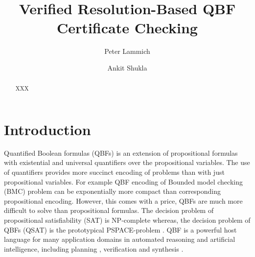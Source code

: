 \documentclass[runningheads]{llncs}
\newcommand{\0}{0}
\newcommand{\1}{1}
\begin{document}

%
\title{Verified Resolution-Based QBF Certificate Checking}


%
\author{Peter Lammich \and Ankit Shukla}

%
%
\maketitle              %
%
\begin{abstract} 
 XXX

\end{abstract}

\section{Introduction}
\label{sec:intro}
Quantified Boolean formulas (QBFs) is an extension of propositional formulas with existential and universal quantifiers over the propositional variables. The use of quantifiers provides more succinct encoding of problems than with just propositional variables. For example QBF encoding of Bounded model checking (BMC) problem \cite{DershowitzHK05} can be exponentially more compact than corresponding propositional encoding. However, this comes with a price, QBFs are much more difficult to solve than propositional formulas. The decision problem of propositional satisfiability (SAT) is NP-complete \cite{Cook71} whereas, the decision problem of QBFs (QSAT) is the prototypical PSPACE-problem \cite{StockmeyerM73}. QBF is a powerful host language for many application domains in automated reasoning and artificial intelligence, including planning \cite{AnsoteguiGS05, EglyKLP17, Cashmore2012planning, Gasquet18}, verification \cite{MillerSB13} and synthesis \cite{BloemKS14, BloemEKKL14, Gange2014synthesizing}.
\end{document}
